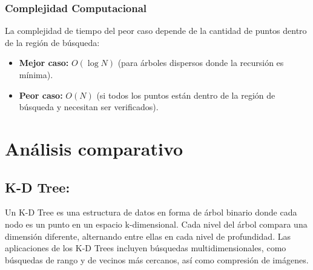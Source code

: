 \documentclass[9pt,a4paper,twoside]{rho-class/rho}
\begin{document}
            \subsubsection{Complejidad Computacional}
                La complejidad de tiempo del peor caso depende de la cantidad de puntos dentro de la región de búsqueda:
                \begin{itemize}
                \item \textbf{Mejor caso:} $O(\log N)$ (para árboles dispersos donde la recursión es mínima).
                \item \textbf{Peor caso:} $O(N)$ (si todos los puntos están dentro de la región de búsqueda y necesitan ser verificados).
                \end{itemize}
    \section{Análisis comparativo}
        \subsection*{K-D Tree:}
            Un K-D Tree es una estructura de datos en forma de árbol binario donde cada nodo es un punto en un espacio k-dimensional. Cada nivel del árbol compara una dimensión diferente, alternando entre ellas en cada nivel de profundidad. Las aplicaciones de los K-D Trees incluyen búsquedas multidimensionales, como búsquedas de rango y de vecinos más cercanos, así como compresión de imágenes.
        
\end{document}
